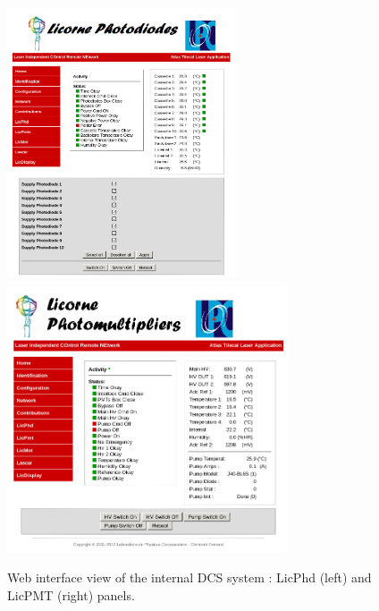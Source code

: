 \begin{appendices}
\newpage


\begin{figure}[htbp]
\centering
\includegraphics[height=8cm]{figures/licorne_web1.png}
\includegraphics[height=8cm]{figures/licorne_web2.png}
\caption{Web interface view of the internal DCS system : LicPhd (left) and LicPMT (right) panels.}\label{fig:licorne_weba}
\end{figure}


\end{appendices}
